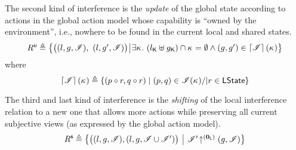 The second kind of interference is the \emph{update} of the global state according to actions in the global action model whose capability is ``owned by the environment'', i.e., nowhere to be found in the current local and shared states.
%
\[	
  \updateR \eqdef
  \left\{
  \begin{array}{@{} l @{\hspace*{2pt}} | @{\hspace*{2pt}} r @{}}
    \left(
    \begin{array}{@{} l @{}}
      (l, g, \lmod),\ 
      (l, g', \lmod)
    \end{array}
    \right)
    &
    \begin{array}{@{} l @{} }
      \begin{array}{@{} l @{}}
	\exsts{\ca{} }\left( \capPart{l} \uplus \capPart{g} \right) \cap \ca{} = \emptyset\land 
	(g, g') \in \padAM{\lmod}(\ca{}) \\
      \end{array}	
    \end{array}
  \end{array}
  \right\}
\]	
%
where
%
\[
\left\lceil \mathscr{I}\right\rceil(\kappa_{}) \triangleq \left\{ (p \circ r, q \circ r) \mid (p, q) \in \mathscr{I}(\kappa_{}) /| r \in \mathsf{LState} \right\}
\]
%

The third and last kind of interference is the \emph{shifting} of the local interference relation to a new one that allows more actions while preserving all current subjective views (as expressed by the global action model).
%
\[
  \shiftR \eqdef
  \left\{
  \begin{array}{@{} l @{\hspace*{5pt}} | @{\hspace*{5pt}} r @{}}
    \left(
    \begin{array}{@{} l @{}}
      (l, g, \lmod),
      \left( l, g, \lmod \cup \lmod' \right)
    \end{array}
    \right)
    &
    \expandsAM{\lmod'}{\unitL}{g}{\lmod}
  \end{array}
  \right\}
\]


